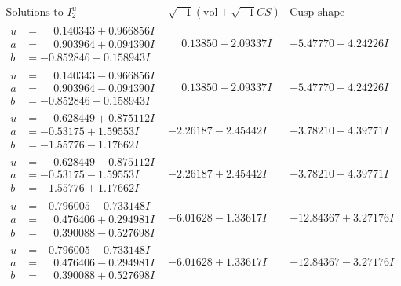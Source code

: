 \documentclass[1p]{elsarticle_modified}
\theoremstyle{definition}
\newcommand{\I}{\sqrt{-1}}
\begin{document}
$$\begin{array}{c|c|c}  
\text{Solutions to }I^u_{2}& \I (\text{vol} + \sqrt{-1}CS) & \text{Cusp shape}\\
 \hline 
\begin{aligned}
u &= \phantom{-}0.140343 + 0.966856 I \\
a &= \phantom{-}0.903964 + 0.094390 I \\
b &= -0.852846 + 0.158943 I\end{aligned}
 & \phantom{-}0.13850 - 2.09337 I & -5.47770 + 4.24226 I \\ \hline\begin{aligned}
u &= \phantom{-}0.140343 - 0.966856 I \\
a &= \phantom{-}0.903964 - 0.094390 I \\
b &= -0.852846 - 0.158943 I\end{aligned}
 & \phantom{-}0.13850 + 2.09337 I & -5.47770 - 4.24226 I \\ \hline\begin{aligned}
u &= \phantom{-}0.628449 + 0.875112 I \\
a &= -0.53175 + 1.59553 I \\
b &= -1.55776 - 1.17662 I\end{aligned}
 & -2.26187 - 2.45442 I & -3.78210 + 4.39771 I \\ \hline\begin{aligned}
u &= \phantom{-}0.628449 - 0.875112 I \\
a &= -0.53175 - 1.59553 I \\
b &= -1.55776 + 1.17662 I\end{aligned}
 & -2.26187 + 2.45442 I & -3.78210 - 4.39771 I \\ \hline\begin{aligned}
u &= -0.796005 + 0.733148 I \\
a &= \phantom{-}0.476406 + 0.294981 I \\
b &= \phantom{-}0.390088 - 0.527698 I\end{aligned}
 & -6.01628 - 1.33617 I & -12.84367 + 3.27176 I \\ \hline\begin{aligned}
u &= -0.796005 - 0.733148 I \\
a &= \phantom{-}0.476406 - 0.294981 I \\
b &= \phantom{-}0.390088 + 0.527698 I\end{aligned}
 & -6.01628 + 1.33617 I & -12.84367 - 3.27176 I \\ \hline\begin{aligned}

\end{aligned}
\end{array}$$
\end{document}
